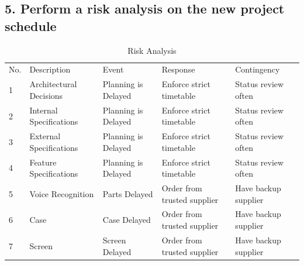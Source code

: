 \documentclass{article}
\begin{document}
\subsection{5. Perform a risk analysis on the new project schedule }



\begin{table}[H]
\centering
\caption{Risk Analysis}
\label{my-label}
\begin{tabular}{lllll}
No. & Description                   & Event                                                           & Response                                                             & Contingency                                                           \\
1        & Architectural Decisions       & Planning is Delayed                                             & Enforce strict timetable                                             & Status review often                                                   \\
2        & Internal Specifications       & Planning is Delayed                                             & Enforce strict timetable                                             & Status review often                                                   \\
3        & External Specifications       & Planning is Delayed                                             & Enforce strict timetable                                             & Status review often                                                   \\
4        & Feature Specifications        & Planning is Delayed                                             & Enforce strict timetable                                             & Status review often                                                   \\
5        & Voice Recognition             & Parts Delayed                                                   & Order from trusted supplier                     & Have backup supplier                                                  \\
6        & Case                          & Case Delayed                                                    &Order from trusted supplier                     & Have backup supplier                                                  \\
7        & Screen                        & Screen Delayed                                                  & Order from trusted supplier                      & Have backup supplier                                                  \\

\end{tabular}
\end{table}
\end{document}
